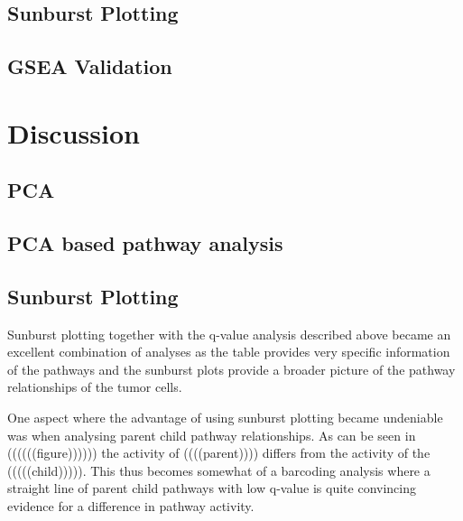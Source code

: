 \documentclass{kththesis}
\begin{document}
     \section{Sunburst Plotting}


     \section{GSEA Validation}




\chapter{Discussion}

     \section{PCA}

     \section{PCA based pathway analysis}



     \section{Sunburst Plotting}
     Sunburst plotting together with the q-value analysis described above became an excellent combination of analyses as the table provides very specific information of the pathways and the sunburst plots provide a broader picture of the pathway relationships of the tumor cells.

     One aspect where the advantage of using sunburst plotting became undeniable was when analysing parent child pathway relationships. As can be seen in ((((((figure)))))) the activity of ((((parent)))) differs from the activity of the (((((child))))). This thus becomes somewhat of a barcoding analysis where a straight line of parent child pathways with low q-value is quite convincing evidence for a difference in pathway activity.
\end{document}
